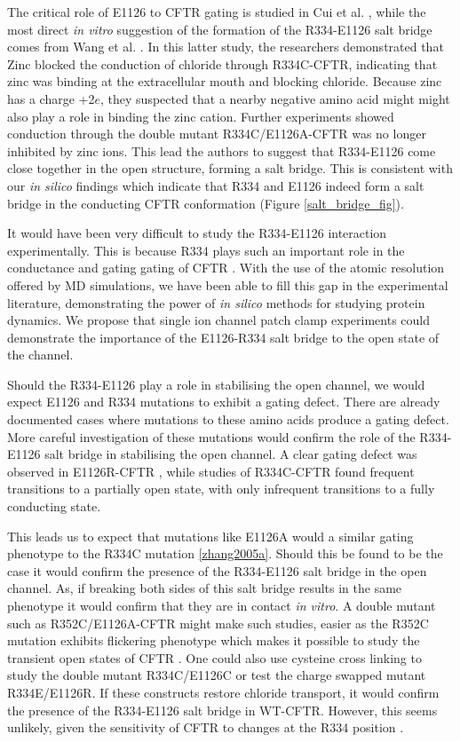 The critical role of E1126 to CFTR gating is studied in Cui et al. \cite{cui2014}, while the most direct \textit{in vitro} suggestion of the formation of the R334-E1126 salt bridge comes from Wang et al. \cite{wang2016}. In this latter study, the researchers demonstrated that Zinc blocked the conduction of chloride through R334C-CFTR, indicating that zinc was binding at the extracellular mouth and blocking chloride. Because zinc has a charge +2$e$, they suspected that a nearby negative amino acid might might also play a role in binding the zinc cation. Further experiments showed conduction through the double mutant R334C/E1126A-CFTR was no longer inhibited by zinc ions. This lead the authors to suggest that R334-E1126 come close together in the open structure, forming a salt bridge. This is consistent with our \textit{in silico} findings which indicate that R334 and E1126 indeed form a salt bridge in the conducting CFTR conformation (Figure \ref{salt_bridge_fig}).  

It would have been very difficult to study the R334-E1126 interaction experimentally. This is because R334 plays such an important role in the conductance and gating gating of CFTR \cite{}. With the use of the atomic resolution offered by MD simulations, we have been able to fill this gap in the experimental literature, demonstrating the power of \textit {in silico} methods for studying protein dynamics. We propose that single ion channel patch clamp experiments could demonstrate the importance of the E1126-R334 salt bridge to the open state of the channel. 

Should the R334-E1126 play a role in stabilising the open channel, we would expect E1126 and R334 mutations to exhibit a gating defect. There are already documented cases where mutations to these amino acids produce a gating defect. More careful investigation of these mutations would confirm the role of the R334-E1126 salt bridge in stabilising the open channel. A clear gating defect was observed in E1126R-CFTR \cite{cui2014}, while studies of R334C-CFTR found frequent transitions to a partially open state, with only infrequent transitions to a fully conducting state. 

This leads us to expect that mutations like E1126A would a similar gating phenotype to the R334C mutation \ref{zhang2005a}. Should this be found to be the case it would confirm the presence of the R334-E1126 salt bridge in the open channel. As, if breaking both sides of this salt bridge results in the same phenotype it would confirm that they are in contact \textit{in vitro}. A double mutant such as R352C/E1126A-CFTR might make such studies, easier as the R352C mutation exhibits flickering phenotype which makes it possible to study the transient open states of CFTR \cite{}. One could also use cysteine cross linking to study the double mutant R334C/E1126C or test the charge swapped mutant R334E/E1126R. If these constructs restore chloride transport, it would confirm the presence of the R334-E1126 salt bridge in WT-CFTR. However, this seems unlikely, given the sensitivity of CFTR to changes at the R334 position \cite{gong2004}. 

